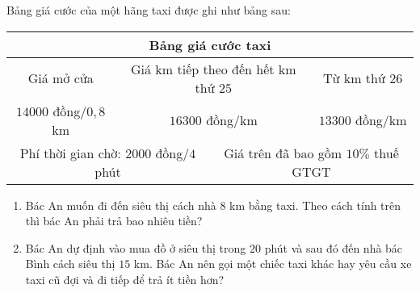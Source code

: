 \begin{bt}%
	Bảng giá cước của một hãng taxi được ghi như bảng sau:
	\begin{center}
		\begin{tabular}{|c|l|c|c|c|l|}
			\hline
			\multicolumn{6}{|c|}{\textbf{Bảng giá cước taxi}}\\ \hline
			\multicolumn{2}{|c|}{Giá mở cửa} & \multicolumn{2}{c|}{Giá km tiếp theo đến hết km thứ $25$} & \multicolumn{2}{c|}{Từ km thứ $26$}\\ \hline
			\multicolumn{2}{|c|}{$14000$ đồng/$0,8$ km} & \multicolumn{2}{c|}{$16300$ đồng/km} & \multicolumn{2}{c|}{$13300$ đồng/km}\\ \hline
			\multicolumn{3}{|c|}{Phí thời gian chờ: $2000$ đồng/$4$ phút} & \multicolumn{3}{c|}{Giá trên đã bao gồm $10\%$ thuế GTGT}\\ \hline
		\end{tabular}
	\end{center}
	\begin{enumerate}
		\item Bác An muốn đi đến siêu thị cách nhà $8$ km bằng taxi. Theo cách tính trên thì bác An phải trả bao nhiêu tiền?
		\item Bác An dự định vào mua đồ ở siêu thị trong $20$ phút và sau đó đến nhà bác Bình cách siêu thị $15$ km. Bác An nên gọi một chiếc taxi khác hay yêu cầu xe taxi cũ đợi và đi tiếp để trả ít tiền hơn?
	\end{enumerate}
\end{bt}

